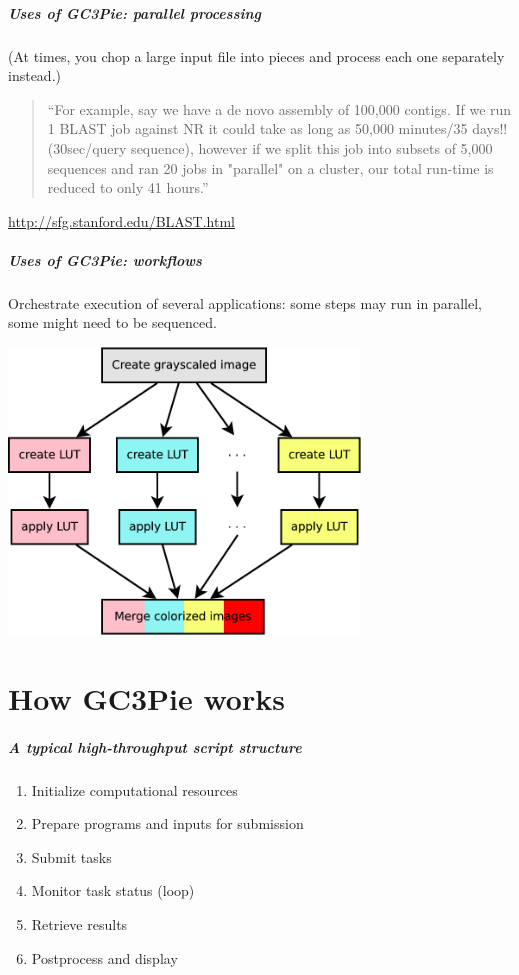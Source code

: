\documentclass[english,serif,mathserif,xcolor=pdftex,dvipsnames,table]{beamer}
\begin{document}
\begin{frame}[fragile]
  \frametitle{Uses of GC3Pie: parallel processing}
  (At times, you chop a large input file into pieces and process each one separately instead.)

  \+
  \begin{quote}
    ``For example, say we have a de novo assembly of 100,000
    contigs. If we run 1 BLAST job against NR it could take as long as
    50,000 minutes/35 days!! (30sec/query sequence), however if we
    split this job into subsets of 5,000 sequences and ran 20 jobs in
    "parallel" on a cluster, our total run-time is reduced to only 41
    hours.''
  \end{quote}
  \begin{references}
    \url{http://sfg.stanford.edu/BLAST.html}
  \end{references}
\end{frame}


\begin{frame}
  \frametitle{Uses of GC3Pie: workflows}

  \begin{center}
    Orchestrate execution of several applications:
    some steps may run in parallel, some might need to be sequenced.

    \+
    \includegraphics[width=0.70\textwidth]{fig/warholize-wkf.pdf}
  \end{center}
\end{frame}


\part{How GC3Pie works}

\begin{frame}
  \frametitle{A typical high-throughput script structure}

  \begin{enumerate}
  \item Initialize computational resources
  \item Prepare programs and inputs for submission
  \item Submit tasks
  \item Monitor task status (loop)
  \item Retrieve results
  \item Postprocess and display
  \end{enumerate}
\end{frame}
\end{document}
